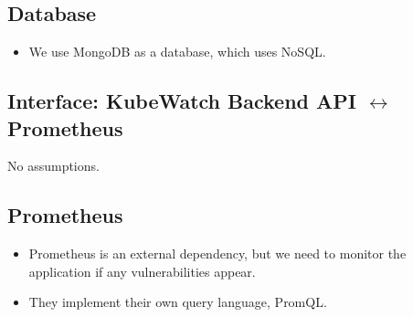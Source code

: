 \subsection{Database}
\begin{itemize}
    \item We use MongoDB as a database, which uses NoSQL.
\end{itemize}


\subsection{Interface: KubeWatch Backend API \(\leftrightarrow\) Prometheus}
No assumptions.

\subsection{Prometheus}
\begin{itemize}
    \item Prometheus is an external dependency, but we need to monitor the application if any vulnerabilities appear.
    \item They implement their own query language, PromQL.
\end{itemize}
